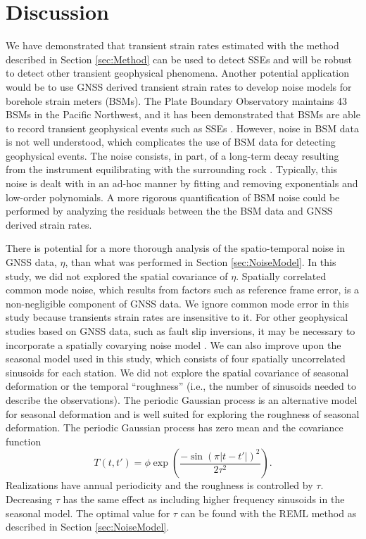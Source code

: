 \documentclass[10pt,letter]{article}
\begin{document}
\section{Discussion}\label{sec:Discussion}
We have demonstrated that transient strain rates estimated with the method described in Section \ref{sec:Method} can be used to detect SSEs and will be robust to detect other transient geophysical phenomena. Another potential application would be to use GNSS derived transient strain rates to develop noise models for borehole strain meters (BSMs). The Plate Boundary Observatory maintains 43 BSMs in the Pacific Northwest, and it has been demonstrated that BSMs are able to record transient geophysical events such as SSEs \citep[e.g.,][]{Dragert2011}. However, noise in BSM data is not well understood, which complicates the use of BSM data for detecting geophysical events. The noise consists, in part, of a long-term decay resulting from the instrument equilibrating with the surrounding rock \citep{Gladwin1987}. Typically, this noise is dealt with in an ad-hoc manner by fitting and removing exponentials and low-order polynomials. A more rigorous quantification of BSM noise could be performed by analyzing the residuals between the the BSM data and GNSS derived strain rates.    

There is potential for a more thorough analysis of the spatio-temporal noise in GNSS data, $\eta$, than what was performed in Section \ref{sec:NoiseModel}. In this study, we did not explored the spatial covariance of $\eta$. Spatially correlated common mode noise, which results from factors such as reference frame error, is a non-negligible component of GNSS data. We ignore common mode error in this study because transients strain rates are insensitive to it. For other geophysical studies based on GNSS data, such as fault slip inversions, it may be necessary to incorporate a spatially covarying noise model \citep[e.g.,][]{Miyazaki2003}. We can also improve upon the seasonal model used in this study, which consists of four spatially uncorrelated sinusoids for each station. We did not explore the spatial covariance of seasonal deformation or the temporal ``roughness'' (i.e., the number of sinusoids needed to describe the observations). The periodic Gaussian process \citep{Mackay1998} is an alternative model for seasonal deformation and is well suited for exploring the roughness of seasonal deformation.  The periodic Gaussian process has zero mean and the covariance function
\begin{equation}\label{eq:Periodic}
T(t,t') = \phi \exp\left(\frac{-\sin(\pi|t - t'|)^2}{2\tau^2}\right).
\end{equation}
Realizations have annual periodicity and the roughness is controlled by $\tau$. Decreasing $\tau$ has the same effect as including higher frequency sinusoids in the seasonal model. The optimal value for $\tau$ can be found with the REML method as described in Section \ref{sec:NoiseModel}. 
\end{document}
